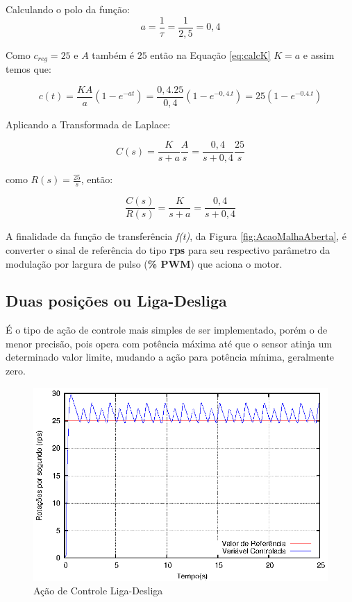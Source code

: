 Calculando o polo da função:
\begin{equation}
  a = \frac{1}{\tau} = \frac{1}{2,5} = 0,4
\end{equation}

Como $c_{reg} = 25$ e $A$ também é $25$ então na Equação \ref{eq:calcK} $K = a$ e assim temos que:

\begin{equation}
c(t) = \frac{KA}{a}(1-e^{-at}) = \frac{0,4.25}{0,4}(1-e^{-0,4.t}) = 25(1-e^{-0.4.t})
\end{equation}


Aplicando a Transformada de Laplace:

\begin{equation}
  C(s) = \frac{K}{s+a}\frac{A}{s} = \frac{0,4}{s+0,4}\frac{25}{s}
\end{equation}

como $R(s) = \frac{25}{s}$, então:

\begin{equation}
  \frac{C(s)}{R(s)} = \frac{K}{s+a} = \frac{0,4}{s+0,4}
\end{equation}

A finalidade da função de transferência \emph{f(t)}, da Figura \ref{fig:AcaoMalhaAberta}, é converter o sinal de referência do tipo \textbf{rps} para seu respectivo parâmetro da modulação por largura de pulso (\textbf{\% PWM}) que aciona o motor.




\subsection{ Duas posições ou Liga-Desliga }
É o tipo de ação de controle mais simples de ser implementado, porém o de menor precisão, pois opera com potência máxima até que o sensor atinja um determinado valor limite, mudando a ação para potência mínima, geralmente zero.

\begin{figure}[!htb]
\center\includegraphics[scale=1]{./imagens/acaoControle-ligaDesliga.eps}
\caption{Ação de Controle Liga-Desliga}
\label{fig:acaoControleLigaDesliga}
\end{figure}

